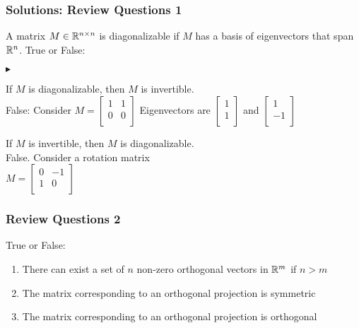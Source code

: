 \documentclass{beamer}
\renewenvironment{itemize}
\renewenvironment{enumerate}%
{\begin{list}{\arabic{enumi}.}%
      {\setlength{\leftmargin}{2.5em}%
       \setlength{\itemsep}{-\parsep}%
       \setlength{\topsep}{-\parskip}%
       \usecounter{enumi}}%
 }{\end{list}}
\renewenvironment{itemize}%
{\begin{list}{$\blacktriangleright$}%
      {\setlength{\leftmargin}{2.5em}%
       \setlength{\itemsep}{-\parsep}%
       \setlength{\topsep}{-\parskip}%
       \usecounter{enumi}}%
 }{\end{list}}
\begin{document}
\begin{frame}
\frametitle{Solutions: Review Questions 1}
A matrix $M\in \mathbb{R}^{n\times n}$ is diagonalizable if $M$ has a basis of eigenvectors that span $\mathbb{R}^n$.
True or False:
\begin{solution}
\begin{itemize}
\item If $M$ is diagonalizable, then $M$ is invertible.\\
False: Consider $M = \begin{bmatrix}
1 & 1\\
0 & 0\\
\end{bmatrix}$ Eigenvectors are $\begin{bmatrix}
1 \\
1 \\
\end{bmatrix}$ and $\begin{bmatrix}
1\\
-1 \\
\end{bmatrix}$
\item If $M$ is invertible, then $M$ is diagonalizable.\\
False. Consider a rotation matrix \\
$M = \begin{bmatrix}
0 & -1\\
1 & 0\\
\end{bmatrix}$
\end{itemize}
\end{solution}
\end{frame}


\begin{frame}
\frametitle{Review Questions 2}
True or False:
\begin{enumerate}
\item There can exist a set of $n$ non-zero orthogonal vectors in $\mathbb{R}^m$ if $n > m$
\item The matrix corresponding to an orthogonal projection is symmetric
\item The matrix corresponding to an orthogonal projection is orthogonal
\end{enumerate}
\end{frame}
\end{document}
